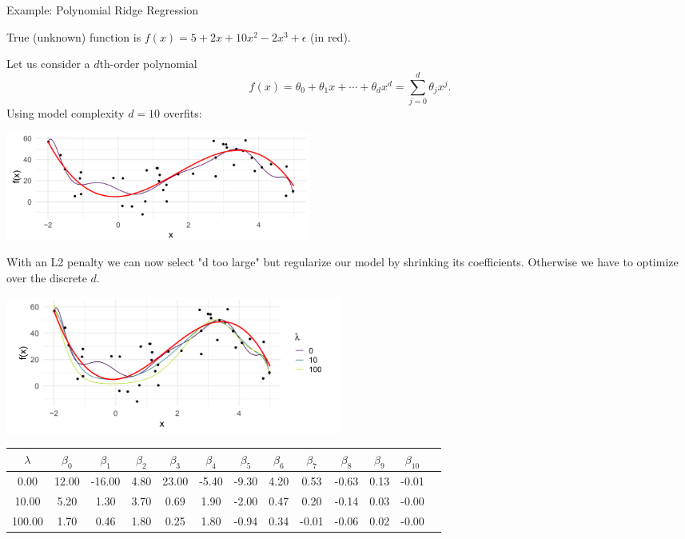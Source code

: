 \begin{vbframe}{Example: Polynomial Ridge Regression}

True (unknown) function is \(f(x) = 5 + 2x +10x^2 - 2x^3 + \epsilon\) (in red).

\lz

Let us consider a \(d\)th-order polynomial
\[ f(x) = \theta_0 + \theta_1 x + \cdots + \theta_d x^d = \sum_{j = 0}^{d} \theta_j x^j\text{.} \]
Using model complexity $d = 10$ overfits:

\begin{center}
\includegraphics[width = 10cm ]{figure_man/poly-ridge.png} \\
\end{center}

\framebreak

With an L2 penalty we can now select "d too large" but regularize our model by shrinking its coefficients. Otherwise we have to optimize over the discrete $d$.

\vfill

\begin{center}
\includegraphics[width = 11cm ]{figure_man/poly-ridge02.png} \\
\end{center}


\begin{center}
\tiny
\begin{tabular}{ c| c c c c c c c c c c c c}
 $\lambda$ & $\beta_0$ & $\beta_1$ & $\beta_2$ & $\beta_3$ & $\beta_4$ & $\beta_5$ & $\beta_6$ & $\beta_7$ & $\beta_8$ & $\beta_9$ & $\beta_{10}$ \\ 
 \hline
 0.00 & 12.00 & -16.00 & 4.80 & 23.00 & -5.40 & -9.30 & 4.20 & 0.53 & -0.63 & 0.13 & -0.01 \\  
 10.00 & 5.20 &1.30 & 3.70 & 0.69 & 1.90 & -2.00 & 0.47 & 0.20 & -0.14 & 0.03 & -0.00 \\ 
 100.00 & 1.70 & 0.46 & 1.80 & 0.25 & 1.80 & -0.94 & 0.34 & -0.01 & -0.06 & 0.02 & -0.00
\end{tabular}
\end{center}


\end{vbframe}

